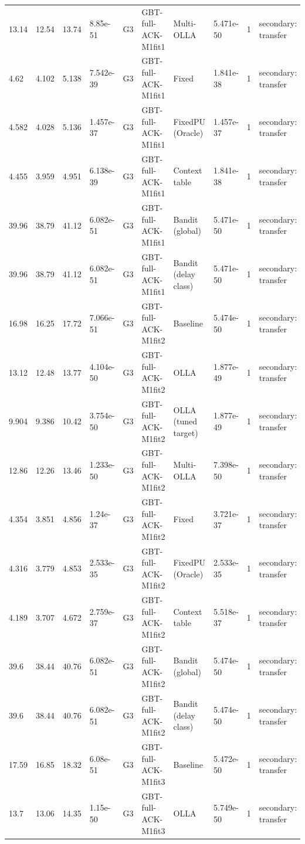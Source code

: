 \documentclass[10pt]{article}
\begin{document}
\begin{landscape}
\begin{longtable}{@{}llllllllll@{}}
13.14 & 12.54 & 13.74 & 8.85e-51 & G3 & GBT-full-ACK-M1fit1 & Multi-OLLA & 5.471e-50 & 1 & secondary: transfer \\
4.62 & 4.102 & 5.138 & 7.542e-39 & G3 & GBT-full-ACK-M1fit1 & Fixed & 1.841e-38 & 1 & secondary: transfer \\
4.582 & 4.028 & 5.136 & 1.457e-37 & G3 & GBT-full-ACK-M1fit1 & FixedPU (Oracle) & 1.457e-37 & 1 & secondary: transfer \\
4.455 & 3.959 & 4.951 & 6.138e-39 & G3 & GBT-full-ACK-M1fit1 & Context table & 1.841e-38 & 1 & secondary: transfer \\
39.96 & 38.79 & 41.12 & 6.082e-51 & G3 & GBT-full-ACK-M1fit1 & Bandit (global) & 5.471e-50 & 1 & secondary: transfer \\
39.96 & 38.79 & 41.12 & 6.082e-51 & G3 & GBT-full-ACK-M1fit1 & Bandit (delay class) & 5.471e-50 & 1 & secondary: transfer \\
16.98 & 16.25 & 17.72 & 7.066e-51 & G3 & GBT-full-ACK-M1fit2 & Baseline & 5.474e-50 & 1 & secondary: transfer \\
13.12 & 12.48 & 13.77 & 4.104e-50 & G3 & GBT-full-ACK-M1fit2 & OLLA & 1.877e-49 & 1 & secondary: transfer \\
9.904 & 9.386 & 10.42 & 3.754e-50 & G3 & GBT-full-ACK-M1fit2 & OLLA (tuned target) & 1.877e-49 & 1 & secondary: transfer \\
12.86 & 12.26 & 13.46 & 1.233e-50 & G3 & GBT-full-ACK-M1fit2 & Multi-OLLA & 7.398e-50 & 1 & secondary: transfer \\
4.354 & 3.851 & 4.856 & 1.24e-37 & G3 & GBT-full-ACK-M1fit2 & Fixed & 3.721e-37 & 1 & secondary: transfer \\
4.316 & 3.779 & 4.853 & 2.533e-35 & G3 & GBT-full-ACK-M1fit2 & FixedPU (Oracle) & 2.533e-35 & 1 & secondary: transfer \\
4.189 & 3.707 & 4.672 & 2.759e-37 & G3 & GBT-full-ACK-M1fit2 & Context table & 5.518e-37 & 1 & secondary: transfer \\
39.6 & 38.44 & 40.76 & 6.082e-51 & G3 & GBT-full-ACK-M1fit2 & Bandit (global) & 5.474e-50 & 1 & secondary: transfer \\
39.6 & 38.44 & 40.76 & 6.082e-51 & G3 & GBT-full-ACK-M1fit2 & Bandit (delay class) & 5.474e-50 & 1 & secondary: transfer \\
17.59 & 16.85 & 18.32 & 6.08e-51 & G3 & GBT-full-ACK-M1fit3 & Baseline & 5.472e-50 & 1 & secondary: transfer \\
13.7 & 13.06 & 14.35 & 1.15e-50 & G3 & GBT-full-ACK-M1fit3 & OLLA & 5.749e-50 & 1 & secondary: transfer \\

\end{longtable}
\end{landscape}
\end{document}
